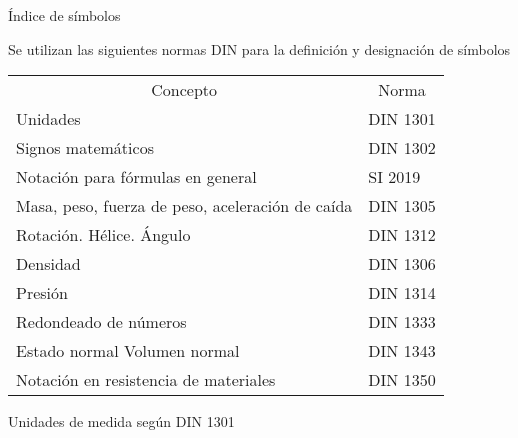 

\newpage
{}
\tableofcontents 
\newpage

\listoffigures 
\newpage

\listoftables 
\newpage


\begin{center}
	{\Large  Índice de símbolos}
\end{center}

Se utilizan las siguientes normas DIN para la definición y designación de símbolos\\


\begin{mytable}[H]
	\centering
	\begin{tabular}{ll}
		\multicolumn{1}{c}{Concepto} & \multicolumn{1}{c}{Norma} \\
		Unidades & DIN 1301 \\
		Signos matemáticos & DIN 1302 \\
		Notación para fórmulas en general & SI 2019 \\
		Masa, peso, fuerza de peso, aceleración de caída & DIN 1305 \\
		Rotación. Hélice. Ángulo & DIN 1312 \\
		Densidad & DIN 1306 \\
		Presión & DIN 1314 \\
		Redondeado de números & DIN 1333 \\
		Estado normal Volumen normal & DIN 1343 \\
		Notación en resistencia de materiales & DIN 1350
	\end{tabular}
\end{mytable}

Unidades de medida según DIN 1301


\newpage
